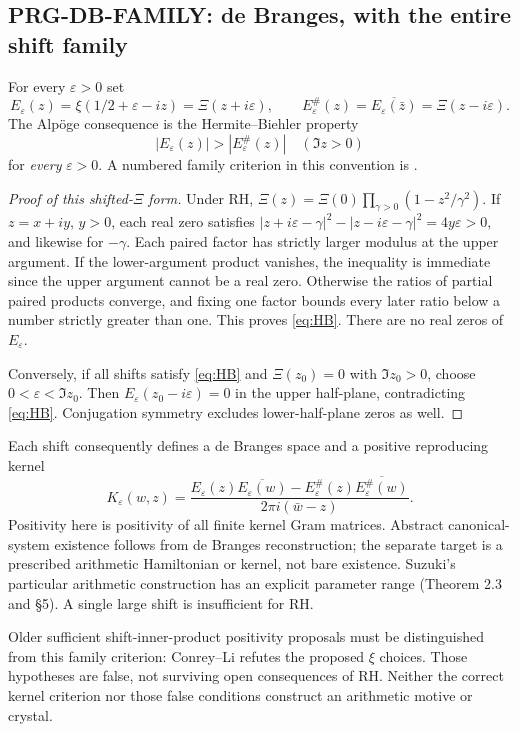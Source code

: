 \documentclass[11pt,a4paper]{article}
\begin{document}
\subsection{PRG-DB-FAMILY: de Branges, with the entire shift family}
For every $\varepsilon>0$ set
\[
 E_\varepsilon(z)=\xi(1/2+\varepsilon-iz)=\Xi(z+i\varepsilon),\qquad
 E_\varepsilon^\#(z)=\overline{E_\varepsilon(\bar z)}=\Xi(z-i\varepsilon).
\]
The Alp\"oge consequence is the Hermite--Biehler property
\begin{equation}\label{eq:HB}
 |E_\varepsilon(z)|>|E_\varepsilon^\#(z)|\quad(\Im z>0)
\end{equation}
for \emph{every} $\varepsilon>0$. A numbered family criterion in this convention is \cite[Proposition 1.2; (1.3), (1.7), (1.11)]{suzuki}.
\begin{proof}[Proof of this shifted-$\Xi$ form]
Under RH, $\Xi(z)=\Xi(0)\prod_{\gamma>0}(1-z^2/\gamma^2)$. If $z=x+iy$, $y>0$, each real zero satisfies
$|z+i\varepsilon-\gamma|^2-|z-i\varepsilon-\gamma|^2=4y\varepsilon>0$, and likewise for $-\gamma$. Each paired factor has strictly larger modulus at the upper argument. If the lower-argument product vanishes, the inequality is immediate since the upper argument cannot be a real zero. Otherwise the ratios of partial paired products converge, and fixing one factor bounds every later ratio below a number strictly greater than one. This proves \eqref{eq:HB}. There are no real zeros of $E_\varepsilon$.

Conversely, if all shifts satisfy \eqref{eq:HB} and $\Xi(z_0)=0$ with $\Im z_0>0$, choose $0<\varepsilon<\Im z_0$. Then $E_\varepsilon(z_0-i\varepsilon)=0$ in the upper half-plane, contradicting \eqref{eq:HB}. Conjugation symmetry excludes lower-half-plane zeros as well.
\end{proof}
Each shift consequently defines a de Branges space and a positive reproducing kernel
\[
 K_\varepsilon(w,z)=
 \frac{E_\varepsilon(z)\overline{E_\varepsilon(w)}-
 E_\varepsilon^\#(z)\overline{E_\varepsilon^\#(w)}}{2\pi i(\bar w-z)}.
\]
Positivity here is positivity of all finite kernel Gram matrices. Abstract canonical-system existence follows from de Branges reconstruction; the separate target is a prescribed arithmetic Hamiltonian or kernel, not bare existence. Suzuki's particular arithmetic construction has an explicit parameter range (Theorem 2.3 and \S5). A single large shift is insufficient for RH.

Older sufficient shift-inner-product positivity proposals must be distinguished from this family criterion: Conrey--Li \cite[\S3.1, (3.1)--(3.4)]{conreyli} refutes the proposed $\xi$ choices. Those hypotheses are false, not surviving open consequences of RH. Neither the correct kernel criterion nor those false conditions construct an arithmetic motive or crystal.
\end{document}
